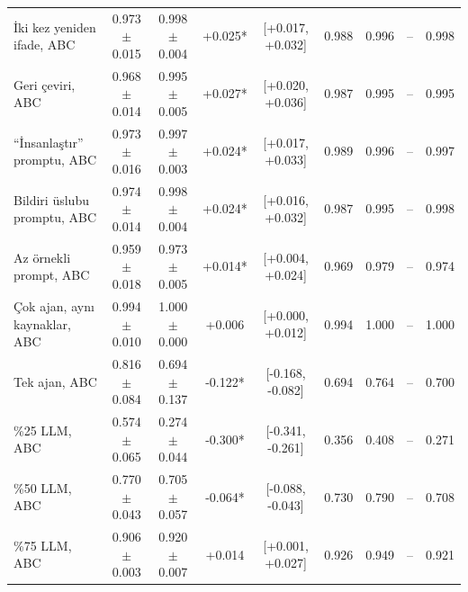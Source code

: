 \begin{table}[t]
\begin{tabular}{@{}lcccccccc@{}}
İki kez yeniden ifade, ABC & 0.973$\pm$0.015 & 0.998$\pm$0.004 & +0.025* & [+0.017, +0.032] & 0.988 & 0.996 & -- & 0.998 \\
Geri çeviri, ABC & 0.968$\pm$0.014 & 0.995$\pm$0.005 & +0.027* & [+0.020, +0.036] & 0.987 & 0.995 & -- & 0.995 \\
``İnsanlaştır'' promptu, ABC & 0.973$\pm$0.016 & 0.997$\pm$0.003 & +0.024* & [+0.017, +0.033] & 0.989 & 0.996 & -- & 0.997 \\
Bildiri üslubu promptu, ABC & 0.974$\pm$0.014 & 0.998$\pm$0.004 & +0.024* & [+0.016, +0.032] & 0.987 & 0.995 & -- & 0.998 \\
Az örnekli prompt, ABC & 0.959$\pm$0.018 & 0.973$\pm$0.005 & +0.014* & [+0.004, +0.024] & 0.969 & 0.979 & -- & 0.974 \\
Çok ajan, aynı kaynaklar, ABC & 0.994$\pm$0.010 & 1.000$\pm$0.000 & +0.006 & [+0.000, +0.012] & 0.994 & 1.000 & -- & 1.000 \\
Tek ajan, ABC & 0.816$\pm$0.084 & 0.694$\pm$0.137 & -0.122* & [-0.168, -0.082] & 0.694 & 0.764 & -- & 0.700 \\
\%25 LLM, ABC & 0.574$\pm$0.065 & 0.274$\pm$0.044 & -0.300* & [-0.341, -0.261] & 0.356 & 0.408 & -- & 0.271 \\
\%50 LLM, ABC & 0.770$\pm$0.043 & 0.705$\pm$0.057 & -0.064* & [-0.088, -0.043] & 0.730 & 0.790 & -- & 0.708 \\
\%75 LLM, ABC & 0.906$\pm$0.003 & 0.920$\pm$0.007 & +0.014 & [+0.001, +0.027] & 0.926 & 0.949 & -- & 0.921 \\
\bottomrule
\end{tabular}
\end{table}
